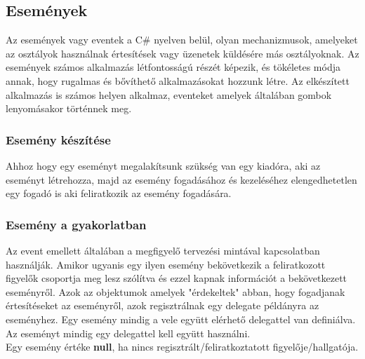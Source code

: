 \documentclass[tocnopagenum]{thesis-ekf}
\theoremstyle{definition}
\theoremstyle{remark}
\begin{document}
	\subsection{Események}
	\label{Eventek}
	Az események vagy eventek \cite{evinC} a C\# nyelven belül, olyan mechanizmusok, amelyeket az osztályok használnak értesítések vagy üzenetek küldésére más osztályoknak. Az események számos alkalmazás létfontosságú részét képezik, és tökéletes módja annak, hogy rugalmas és bővíthető alkalmazásokat hozzunk létre.
	Az elkészített alkalmazás is számos helyen alkalmaz, eventeket amelyek általában gombok lenyomásakor történnek meg.
	\\
	\subsubsection{Esemény készítése}
	Ahhoz hogy egy eseményt megalakítsunk szükség van egy kiadóra, aki az eseményt létrehozza, majd az esemény fogadásához és kezeléséhez elengedhetetlen egy fogadó is aki feliratkozik az esemény fogadására.
	
	\subsubsection{Esemény a gyakorlatban}
	Az event emellett általában a megfigyelő tervezési mintával kapcsolatban használják. Amikor ugyanis egy ilyen esemény bekövetkezik a feliratkozott figyelők csoportja meg lesz szólítva és ezzel kapnak információt a bekövetkezett eseményről. Azok az objektumok amelyek "érdekeltek" abban, hogy fogadjanak értesítéseket az eseményről, azok regisztrálnak egy delegate példányra az eseményhez.
	Egy esemény mindig a vele együtt elérhető delegattel van definiálva. 
	Az eseményt mindig egy delegattel kell együtt használni.
	\\
	Egy esemény értéke \textbf{null}, ha nincs regisztrált/feliratkoztatott figyelője/hallgatója.
\end{document}
